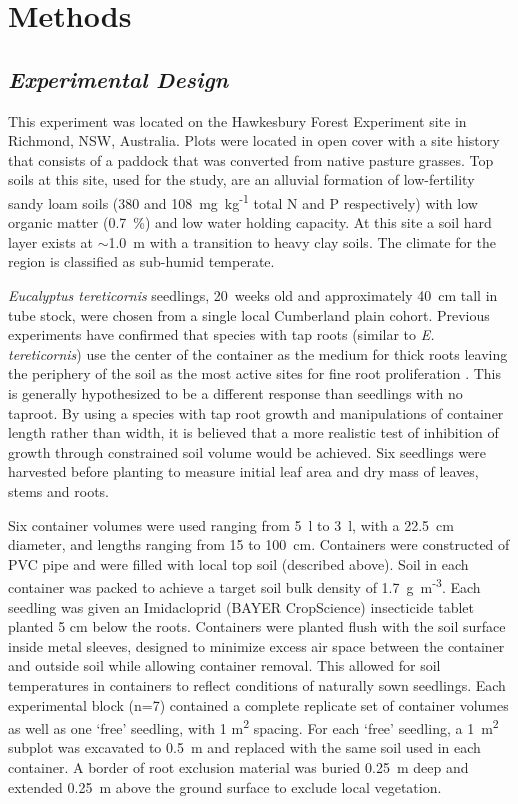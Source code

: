 \documentclass[a4paper]{article}\usepackage[]{graphicx}\usepackage[]{color}
\begin{document}
\section*{Methods}

\subsection*{\textit{Experimental Design}}

This experiment was located on the Hawkesbury Forest Experiment site in Richmond, NSW, Australia. Plots were located in open cover with a site history that consists of a paddock that was converted from native pasture grasses. Top soils at this site, used for the study, are an alluvial formation of low-fertility sandy loam soils (380 and 108~mg~kg\textsuperscript{-1} total N and P respectively) with low organic matter (0.7~\%) and low water holding capacity. At this site a soil hard layer exists at $\sim$1.0~m with a transition to heavy clay soils. The climate for the region is classified as sub-humid temperate. 

\textit{Eucalyptus tereticornis} seedlings, 20~weeks old and approximately 40~cm tall in tube stock, were chosen from a single local Cumberland plain cohort. Previous experiments have confirmed that species with tap roots (similar to \textit{E. tereticornis}) use the center of the container as the medium for thick roots leaving the periphery of the soil as the most active sites for fine root proliferation \cite{biran1980a,biran1980b}. This is generally hypothesized to be a different response than seedlings with no taproot. By using a species with tap root growth and manipulations of container length rather than width, it is believed that a more realistic test of inhibition of growth through constrained soil volume would be achieved. Six seedlings were harvested before planting to measure initial leaf area and dry mass of leaves, stems and roots.

Six container volumes were used ranging from 5~l to 3~l, with a 22.5~cm diameter, and lengths ranging from 15 to 100~cm. Containers were constructed of PVC pipe and were filled with local top soil (described above). Soil in each container was packed to achieve a target soil bulk density of 1.7~g~m\textsuperscript{-3}. Each seedling was given an Imidacloprid (BAYER CropScience) insecticide tablet planted 5 cm below the roots. Containers were planted flush with the soil surface inside metal sleeves, designed to minimize excess air space between the container and outside soil while allowing container removal. This allowed for soil temperatures in containers to reflect conditions of naturally sown seedlings. Each experimental block (n=7) contained a complete replicate set of container volumes as well as one ‘free’ seedling, with 1 m\textsuperscript{2} spacing. For each ‘free’ seedling, a 1~m\textsuperscript{2} subplot was excavated to 0.5~m and replaced with the same soil used in each container. A border of root exclusion material was buried 0.25~m deep and extended 0.25~m above the ground surface to exclude local vegetation.
\end{document}
